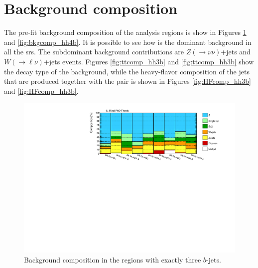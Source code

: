 \section{Background composition}

The pre-fit background composition of the analysis regions is show in Figures \ref{fig:bkgcomp_hh3b} and \ref{fig:bkgcomp_hh4b}.
It is possible to see how \ttbar is the dominant background in all the \glspl{sr}.
The subdominant background contributions are $Z(\to \nu\nu)$+jets and $W(\to \ell\nu)$+jets events.
Figures \ref{fig:ttcomp_hh3b} and \ref{fig:ttcomp_hh3b} show the decay type of the \ttbar background,
while the heavy-flavor composition of the jets that are produced together with the \ttbar pair is shown 
in Figures \ref{fig:HFcomp_hh3b} and \ref{fig:HFcomp_hh3b}.

\begin{figure}[htbp]
\includegraphics[width=\textwidth]{figures/ewk_prod/comp_plots/hh_3b_bkg.pdf}
\caption{Background composition in the regions with exactly three $b$-jets.}
	\label{fig:bkgcomp_hh3b}
\end{figure}


